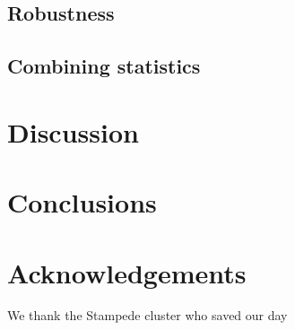 \documentclass[reprint,aps,prd,superscriptaddress,showkeys]{revtex4-1}
\begin{document}
\subsection{Robustness}

\subsection{Combining statistics}


\section{Discussion}


\section{Conclusions}

 

\section*{Acknowledgements}
We thank the Stampede cluster who saved our day


\label{lastpage}
\end{document}
